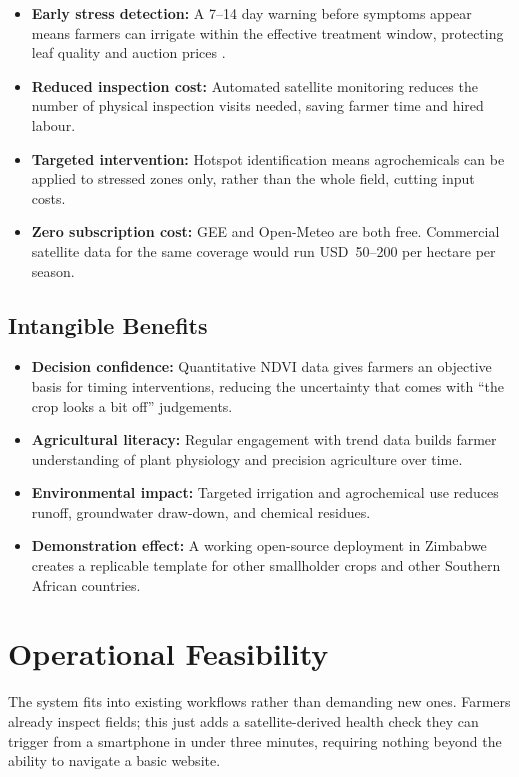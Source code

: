 \documentclass[12pt,a4paper]{report}
\begin{document}
\begin{itemize}
  \item \textbf{Early stress detection:} A 7--14 day warning before symptoms appear means farmers can irrigate within the effective treatment window, protecting leaf quality and auction prices \citep{rouse1974}.
  \item \textbf{Reduced inspection cost:} Automated satellite monitoring reduces the number of physical inspection visits needed, saving farmer time and hired labour.
  \item \textbf{Targeted intervention:} Hotspot identification means agrochemicals can be applied to stressed zones only, rather than the whole field, cutting input costs.
  \item \textbf{Zero subscription cost:} GEE and Open-Meteo are both free. Commercial satellite data for the same coverage would run USD~50--200 per hectare per season.
\end{itemize}

\subsection{Intangible Benefits}

\begin{itemize}
  \item \textbf{Decision confidence:} Quantitative NDVI data gives farmers an objective basis for timing interventions, reducing the uncertainty that comes with ``the crop looks a bit off'' judgements.
  \item \textbf{Agricultural literacy:} Regular engagement with trend data builds farmer understanding of plant physiology and precision agriculture over time.
  \item \textbf{Environmental impact:} Targeted irrigation and agrochemical use reduces runoff, groundwater draw-down, and chemical residues.
  \item \textbf{Demonstration effect:} A working open-source deployment in Zimbabwe creates a replicable template for other smallholder crops and other Southern African countries.
\end{itemize}

\section{Operational Feasibility}

The system fits into existing workflows rather than demanding new ones. Farmers already inspect fields; this just adds a satellite-derived health check they can trigger from a smartphone in under three minutes, requiring nothing beyond the ability to navigate a basic website.
\end{document}

